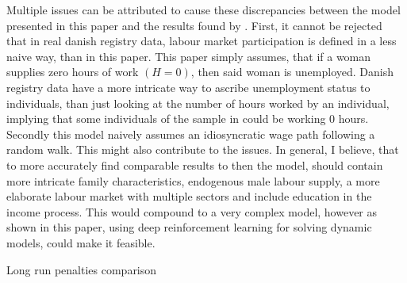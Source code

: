 Multiple issues can be attributed to cause these discrepancies between the model presented in this paper and the results found by \textcite{kleven_children_2019}. First, it cannot be rejected that in real danish registry data, labour market participation is defined in a less naive way, than in this paper. This paper simply assumes, that if a woman supplies zero hours of work $(H=0)$, then said woman is unemployed. Danish registry data have a more intricate way to ascribe unemployment status to individuals, than just looking at the number of hours worked by an individual, implying that some individuals of the sample in \textcite{kleven_children_2019} could be working 0 hours. Secondly this model naively assumes an idiosyncratic wage path following a random walk. This might also contribute to the issues. In general, I believe, that to more accurately find comparable results to \textcite{kleven_children_2019} then the model, should contain more intricate family characteristics, endogenous male labour supply, a more elaborate labour market with multiple sectors and include education in the income process. This would compound to a very complex model, however as shown in this paper, using deep reinforcement learning for solving dynamic models, could make it feasible.

\begin{table}[ht]
    \centering
    
    \caption{Long run penalties comparison}
    \label{tab:extended_results}
\end{table}




